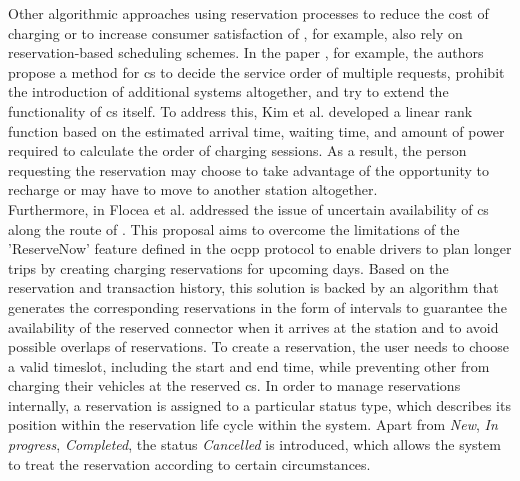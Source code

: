 \noindent Other algorithmic approaches using reservation processes to reduce the cost of charging or to increase consumer satisfaction of , for example, also rely on reservation-based scheduling schemes.
In the paper \cite{kim_efficient_2010}, for example, the authors propose a method for \acrshort{cs} to decide the service order of multiple requests, prohibit the introduction of additional systems altogether, and try to extend the functionality of \acrshort{cs} itself. 
To address this, Kim et al. developed a linear rank function based on the estimated arrival time, waiting time, and amount of power required to calculate the order of charging sessions.
As a result, the person requesting the reservation may choose to take advantage of the opportunity to recharge or may have to move to another station altogether. \\
\noindent Furthermore, in \cite{flocea_electric_2022} Flocea et al. addressed the issue of uncertain availability of \acrshort{cs} along the route of . 
This proposal aims to overcome the limitations of the 'ReserveNow' feature defined in the \acrshort{ocpp} protocol to enable drivers to plan longer trips by creating charging reservations for upcoming days.
Based on the  reservation and transaction history, this solution is backed by an algorithm that generates the corresponding reservations in the form of intervals to guarantee the availability of the reserved connector when it arrives at the station and to avoid possible overlaps of reservations.
To create a reservation, the user needs to choose a valid timeslot, including the start and end time, while preventing other  from charging their vehicles at the reserved \acrshort{cs}.
In order to manage reservations internally, a reservation is assigned to a particular status type, which describes its position within the reservation life cycle within the system. 
Apart from \textit{New}, \textit{In progress}, \textit{Completed}, the status \textit{Cancelled} is introduced, which allows the system to treat the reservation according to certain circumstances.
